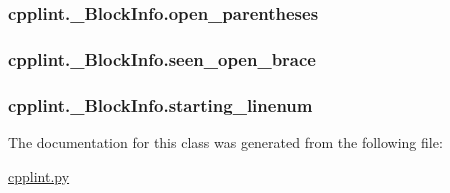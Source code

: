 \subsubsection[{\texorpdfstring{open\+\_\+parentheses}{open_parentheses}}]{\setlength{\rightskip}{0pt plus 5cm}cpplint.\+\_\+\+Block\+Info.\+open\+\_\+parentheses}\hypertarget{classcpplint_1_1__BlockInfo_a02a0b48995a599f6b2bbaa6f16cca98a}{}\label{classcpplint_1_1__BlockInfo_a02a0b48995a599f6b2bbaa6f16cca98a}
\subsubsection[{\texorpdfstring{seen\+\_\+open\+\_\+brace}{seen_open_brace}}]{\setlength{\rightskip}{0pt plus 5cm}cpplint.\+\_\+\+Block\+Info.\+seen\+\_\+open\+\_\+brace}\hypertarget{classcpplint_1_1__BlockInfo_aa974539217437751383ad20896c974d7}{}\label{classcpplint_1_1__BlockInfo_aa974539217437751383ad20896c974d7}
\subsubsection[{\texorpdfstring{starting\+\_\+linenum}{starting_linenum}}]{\setlength{\rightskip}{0pt plus 5cm}cpplint.\+\_\+\+Block\+Info.\+starting\+\_\+linenum}\hypertarget{classcpplint_1_1__BlockInfo_a81d316f03e42aebbfe0636f905c4c291}{}\label{classcpplint_1_1__BlockInfo_a81d316f03e42aebbfe0636f905c4c291}


The documentation for this class was generated from the following file\+:\begin{DoxyCompactItemize}
\item 
\hyperlink{cpplint_8py}{cpplint.\+py}\end{DoxyCompactItemize}
